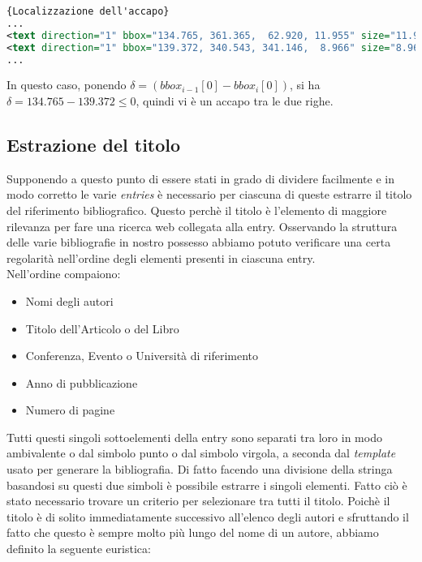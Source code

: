 \begin{lstlisting}[language=XML,frame=r,caption=Esempio di XML in cui si nota l'accapo tra References e la prima voce ,breaklines=true,basicstyle=\small]{Localizzazione dell'accapo}
...
<text direction="1" bbox="134.765, 361.365,  62.920, 11.955" size="11.955">References</text>
<text direction="1" bbox="139.372, 340.543, 341.146,  8.966" size="8.966">1. J.-F. Arias, C.P. Lai, S. Surya, R. Kasturi, and A.K. Chhabra. Interpretation of</text>
...

\end{lstlisting}

In questo caso, ponendo $ \delta  =   (bbox_{i-1}[0] - bbox_{i}[0] ) $, si ha $ \delta  = 134.765 - 139.372 \leq 0$, quindi vi è un accapo tra le due righe.



\subsection{Estrazione del titolo}
Supponendo a questo punto di essere stati in grado di dividere facilmente e in modo corretto le varie \textit{entries} è necessario per ciascuna di queste estrarre il titolo del riferimento bibliografico. Questo perchè il titolo è l'elemento di maggiore rilevanza per fare una ricerca web collegata alla entry. Osservando la struttura delle varie bibliografie in nostro possesso abbiamo potuto verificare una certa regolarità nell'ordine degli elementi presenti in ciascuna entry.
\\
Nell'ordine compaiono:
\begin{itemize}
 \item Nomi degli autori
 \item Titolo dell'Articolo o del Libro
 \item Conferenza, Evento o Università di riferimento
 \item Anno di pubblicazione
 \item Numero di pagine
\end{itemize}

Tutti questi singoli sottoelementi della entry sono separati tra loro in modo ambivalente o dal simbolo punto o dal simbolo virgola, a seconda dal \textit{template} usato per generare la bibliografia. Di fatto facendo una divisione della stringa basandosi su questi due simboli è possibile estrarre i singoli elementi. Fatto ciò è stato necessario trovare un criterio per selezionare tra tutti il titolo.
Poichè il titolo è di solito immediatamente successivo all'elenco degli autori e sfruttando il fatto che questo è sempre molto più lungo del nome di un autore, abbiamo definito la seguente euristica:\\


